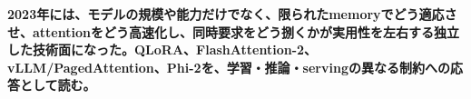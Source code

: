 \noindent\textbf{2023年には、モデルの規模や能力だけでなく、限られたmemoryでどう適応させ、attentionをどう高速化し、同時要求をどう捌くかが実用性を左右する独立した技術面になった。QLoRA、FlashAttention-2、vLLM/PagedAttention、Phi-2を、学習・推論・servingの異なる制約への応答として読む。}\autocite{src-1ab9d44a819a,src-5e1a3a4fc45b,src-6e61359d2fae,src-7f830e688335,src-e03b0ba5b24e,src-fb804ac849e4}
